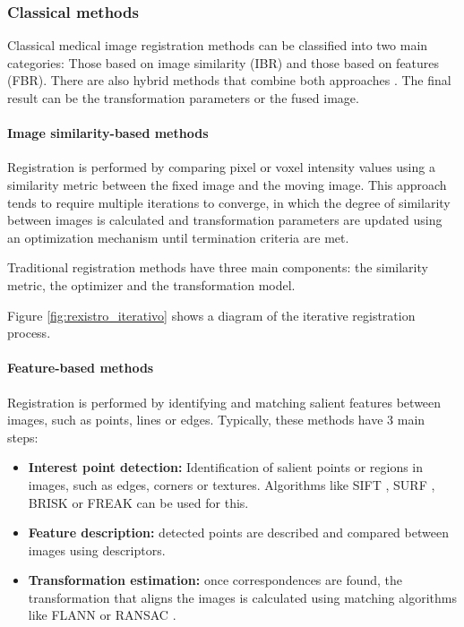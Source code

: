 \subsubsection{Classical methods}\label{subsubsec:Métodos clásicos}

Classical medical image registration methods can be classified into two main categories:
Those based on image similarity (\gls{IBR}) and those based on features (\gls{FBR}).
There are also hybrid methods that combine both approaches \cite{integrateintfeat}.
The final result can be the transformation parameters or the fused image.

\paragraph{Image similarity-based methods}
\label{par:Métodos baseados en similitude de imaxe}

Registration is performed by comparing pixel or voxel intensity values using a similarity metric between the fixed image and the moving image.
This approach tends to require multiple iterations to converge, in which the degree of similarity between images is calculated and
transformation parameters are updated using an optimization mechanism until termination criteria are met.

Traditional registration methods have three main components: the similarity metric, the optimizer and the transformation model.

Figure \ref{fig:rexistro_iterativo} shows a diagram of the iterative registration process.

\paragraph{Feature-based methods}
\label{par:Métodos baseados en características}

Registration is performed by identifying and matching salient features between images, such as points, lines or edges.
Typically, these methods have 3 main steps:

\begin{itemize}
\item \textbf{Interest point detection:} Identification of salient points or regions in images, such as edges, corners or textures. Algorithms like SIFT \cite{sift}, SURF \cite{surf}, BRISK \cite{brisk} or FREAK \cite{freakkeypoint} can be used for this.
\item \textbf{Feature description:} detected points are described and compared between images using descriptors.
\item \textbf{Transformation estimation:} once correspondences are found, the transformation that aligns the images is calculated using matching algorithms like FLANN \cite{flann} or RANSAC \cite{ransac}.
\end{itemize}

